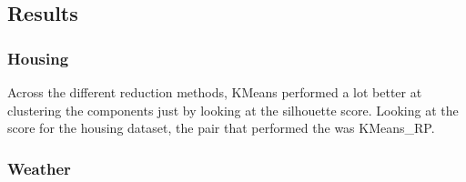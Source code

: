 \documentclass[conference]{IEEEtran}
\begin{document}
\subsection{Results}
\begin{table}[htp]
    \centering
    \caption{Clustering Performance Metrics for Different Reduction Techniques}
    \label{tab:clustering_performance}
\end{table}
\subsubsection{Housing}{
Across the different reduction methods, KMeans performed a lot better at clustering the components just by looking at the silhouette score. Looking at the score for the housing dataset, the pair that performed the was KMeans\_RP.
}

\subsubsection{Weather}
\end{document}
